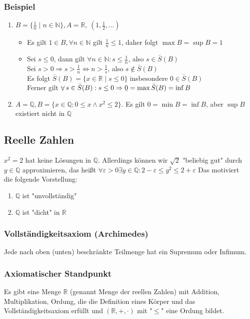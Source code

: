 \documentclass[11pt]{article}
\DeclareMathOperator{\Forall}{\forall}%
\newcommand{\ubar}[1]{\text{\b{$#1$}}}
\begin{document}
\subsubsection{Beispiel}
\label{sec-2-8-2}
\begin{enumerate}
\item $B = \{\frac{1}{n}\mid n\in\mathbb{N}\}, A = \mathbb{R},~(1, \frac{1}{2},\ldots)$
\begin{itemize}
\item Es gilt $1\in B, \Forall n\in\mathbb{N}$ gilt $\frac{1}{n} \leq 1$, daher folgt $\max B = \sup B = 1$
\item Sei $s\leq 0$, dann gilt $\Forall n\in\mathbb{N}: s\leq \frac{1}{n}$, also $s\in \bar{S}(B)$ \\
         Sei $s > 0 \Rightarrow s > \frac{1}{n} \Leftrightarrow n > \frac{1}{s}$, also $s\not\in\bar{S}(B)$ \\
         Es folgt $\bar{S}(B) = \{x\in\mathbb{R}\mid s\leq 0\}$ insbesondere $0\in\bar{S}(B)$ \\
         Ferner gilt $\Forall s\in \bar{S}(B):s\leq 0 \Rightarrow \ubar{0} = \max \bar{S}(B) = \inf B$
\end{itemize}
\item $A = \mathbb{Q}, B = \{x\in\mathbb{Q} : 0 \leq x \wedge x^2 \leq 2\}$. Es gilt $0 = \min B = \inf B$, aber $\sup B$ existiert nicht in $\mathbb{Q}$
\end{enumerate}
\subsection{Reelle Zahlen}
\label{sec-2-9}
$x^2 = 2$ hat keine Lösungen in $\mathbb{Q}$. Allerdings können wir $\sqrt{2}$ "beliebig gut" durch $y\in \mathbb{Q}$ approximieren, das heißt $\Forall \varepsilon > 0\exists y\in\mathbb{Q}:2 - \varepsilon \leq y^2 \leq 2 + \varepsilon$
Das motiviert die folgende Vorstellung:
\begin{enumerate}
\item $\mathbb{Q}$ ist "unvollständig"
\item $\mathbb{Q}$ ist "dicht" in $\mathbb{R}$
\end{enumerate}
\subsubsection{Vollständigkeitsaxiom (Archimedes)}
\label{sec-2-9-1}
Jede nach oben (unten) beschränkte Teilmenge hat ein Supremum oder Infimum.
\subsubsection{Axiomatischer Standpunkt}
\label{sec-2-9-2}
Es gibt eine Menge $\mathbb{R}$ (genannt Menge der reellen Zahlen) mit Addition, Multiplikation, Ordung, die die Definition eines Körper und das Vollständigkeitsaxiom erfüllt und $(\mathbb{R},+,\cdot)$ mit "$\leq$" eine Ordung bildet.
\end{document}
